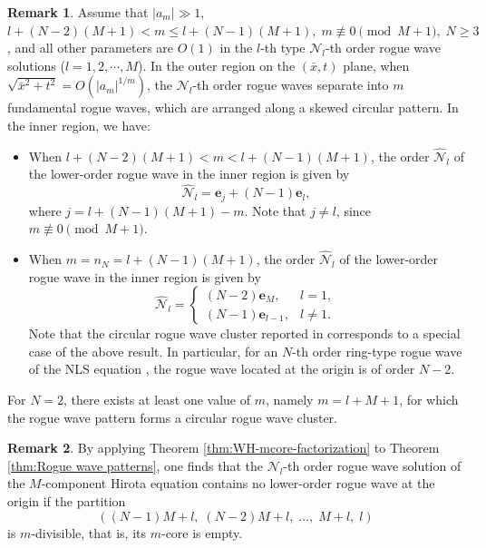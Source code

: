 \documentclass[preprint,3p,10pt]{elsarticle}
\theoremstyle{definition}
\newtheorem{remark}{Remark}[section]
\begin{document}
\begin{remark}\label{remark:circular rogue wave cluster}
Assume that $|a_m|\gg1$, $l+(N-2) (M+1) < m \le l+(N-1)(M+1), \; m \not \equiv0 \pmod{M+1}, \; N\geq3$, and all other parameters are $O(1)$ in the $l$-th type $\mathcal{N}_l$-th order rogue wave solutions ($l =1,2,\cdots,M$). In the outer region on the $(\bar{x},t)$ plane, when $\sqrt{\bar{x}^{2}+t^{2}}=O\left(\left|a_m\right|^{1 /m}\right)$, the $\mathcal{N}_l$-th order rogue waves separate into $m$ fundamental rogue waves, which are arranged along a skewed circular pattern. In the inner region, we have:
\begin{itemize}
    \item When $l+(N-2)(M+1) < m < l+(N-1)(M+1)$, the order $\widehat{\mathcal{N}}_l$ of the lower-order rogue wave in the inner region is given by
    \begin{equation}
       \widehat{\mathcal{N}}_l = \mathbf{e}_{j}+(N-1)\mathbf{e}_{l},
    \end{equation}
    where $j=l+(N-1)(M+1)-m$. Note that $j \not = l$, since $m \not \equiv 0 \pmod{M+1}.$
    
    \item  When \( m = n_N =l+(N-1)(M+1) \), the order $\widehat{\mathcal{N}}_l$ of the lower-order rogue wave in the inner region is given by
\begin{equation}
    \widehat{\mathcal{N}}_l = \begin{cases}
        (N-2) \mathbf{e}_{M}, & l=1,\\
        (N-1) \mathbf{e}_{l-1}, & l \not =1.
    \end{cases}
\end{equation}
Note that the circular rogue wave cluster reported in \cite{kedziora2011circular} corresponds to a special case of the above result. In particular, for an \(N\)-th order ring-type rogue wave of the NLS equation \cite{he2013generating}, the rogue wave located at the origin is of order \(N-2\).
\end{itemize}
For $N=2$, there exists at least one value of $m$, namely $m=l+M+1$, for which the rogue wave pattern forms a circular rogue wave cluster.
\end{remark}


\begin{remark}
By applying Theorem \ref{thm:WH-mcore-factorization} to Theorem \ref{thm:Rogue wave patterns}, one finds that the $\mathcal{N}_l$-th order rogue wave solution of the $M$-component Hirota equation contains no lower-order rogue wave at the origin if the partition
\begin{equation}\label{eqn: partition of remark of RW patterns}
    \left((N-1)M+l,\; (N-2)M+l,\; \ldots,\; M+l,\; l\right)
\end{equation}
is $m$-divisible, that is, its $m$-core is empty.

\end{remark}
\end{document}
